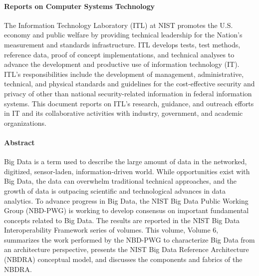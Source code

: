 \documentclass[11pt]{article}
\begin{document}
\paragraph{Reports on Computer Systems Technology}

The Information Technology Laboratory (ITL) at NIST promotes the U.S. economy and public welfare by 
providing technical leadership for the Nation’s measurement and standards infrastructure. ITL develops 
tests, test methods, reference data, proof of concept implementations, and technical analyses to advance 
the development and productive use of information technology (IT). ITL’s responsibilities include the 
development of management, administrative, technical, and physical standards and guidelines for the 
cost-effective security and privacy of other than national security-related information in federal 
information systems. This document reports on ITL’s research, guidance, and outreach efforts in IT and 
its collaborative activities with industry, government, and academic organizations.

\paragraph{Abstract}

Big Data is a term used to describe the large amount of data in the networked, digitized, sensor-laden, 
information-driven world. While opportunities exist with Big Data, the data can overwhelm traditional 
technical approaches, and the growth of data is outpacing scientific and technological advances in data 
analytics. To advance progress in Big Data, the NIST Big Data Public Working Group (NBD-PWG) is 
working to develop consensus on important fundamental concepts related to Big Data. The results are 
reported in the NIST Big Data Interoperability Framework series of volumes. This volume, Volume 6, 
summarizes the work performed by the NBD-PWG to characterize Big Data from an architecture 
perspective, presents the NIST Big Data Reference Architecture (NBDRA) conceptual model, and 
discusses the components and fabrics of the NBDRA. 



\end{document}
